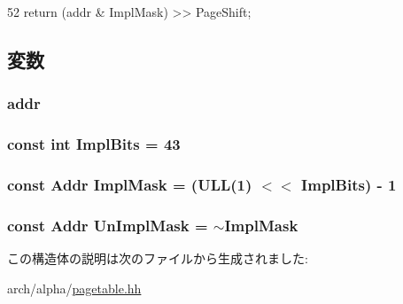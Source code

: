 \begin{DoxyCode}
52 { return (addr & ImplMask) >> PageShift; }
\end{DoxyCode}


\subsection{変数}
\hypertarget{structAlphaISA_1_1VAddr_a0bb77b4ba61e408313e1118250f9278c}{
\subsubsection[{addr}]{ {\bf addr}}}
\label{structAlphaISA_1_1VAddr_a0bb77b4ba61e408313e1118250f9278c}
\hypertarget{structAlphaISA_1_1VAddr_a90a805e8bf3e59628bdcc4ca67fc68c4}{
\subsubsection[{ImplBits}]{\setlength{\rightskip}{0pt plus 5cm}const int {\bf ImplBits} = 43}}
\label{structAlphaISA_1_1VAddr_a90a805e8bf3e59628bdcc4ca67fc68c4}
\hypertarget{structAlphaISA_1_1VAddr_af9099d6c5264dd55210ff2a90bec4c2e}{
\subsubsection[{ImplMask}]{\setlength{\rightskip}{0pt plus 5cm}const {\bf Addr} {\bf ImplMask} = (ULL(1) $<$$<$ {\bf ImplBits}) -\/ 1}}
\label{structAlphaISA_1_1VAddr_af9099d6c5264dd55210ff2a90bec4c2e}
\hypertarget{structAlphaISA_1_1VAddr_aea265d87906fd130da86ab5d0977f26a}{
\subsubsection[{UnImplMask}]{\setlength{\rightskip}{0pt plus 5cm}const {\bf Addr} {\bf UnImplMask} = $\sim${\bf ImplMask}}}
\label{structAlphaISA_1_1VAddr_aea265d87906fd130da86ab5d0977f26a}


この構造体の説明は次のファイルから生成されました:\begin{DoxyCompactItemize}
\item 
arch/alpha/\hyperlink{alpha_2pagetable_8hh}{pagetable.hh}\end{DoxyCompactItemize}
